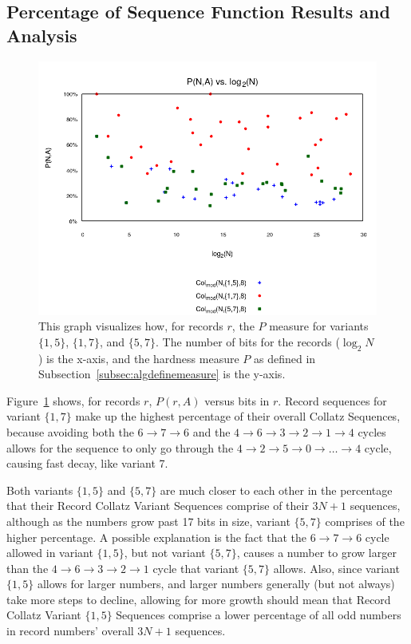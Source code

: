 \subsection{Percentage of Sequence Function Results and Analysis} \label{subsubsec:algmulpercentage}
\begin{figure}
    \centering
    \includegraphics[scale=0.6]{ModAvoidanceAnalysisPics/P_vs_log_multi_base.png}
    \caption{This graph visualizes how, for records $r$, the $P$ measure for variants $\{1,5\}$, $\{1,7\}$, and $\{5,7\}$. The number of bits for the records ($\log_2{N}$) is the x-axis, and the hardness measure $P$ as defined in Subsection~\ref{subsec:algdefinemeasure} is the y-axis.}
    \label{fig:p_multi_vslog}
\end{figure}
Figure~\ref{fig:p_multi_vslog} shows, for records $r$, $P(r,A)$ versus bits in $r$. Record sequences for variant $\{1,7\}$ make up the highest percentage of their overall Collatz Sequences, because avoiding both the $6 \rightarrow 7 \rightarrow 6$ and the $4 \rightarrow 6 \rightarrow 3 \rightarrow 2 \rightarrow 1 \rightarrow 4$ cycles allows for the sequence to only go through the $4  \rightarrow 2 \rightarrow 5 \rightarrow 0 \rightarrow \ldots \rightarrow 4$ cycle, causing fast decay, like variant 7. \par
Both variants $\{1,5\}$ and $\{5,7\}$ are much closer to each other in the percentage that their Record Collatz Variant Sequences comprise of their $3N+1$ sequences, although as the numbers grow past 17 bits in size, variant $\{5,7\}$ comprises of the higher percentage. A possible explanation is the fact that the $6 \rightarrow 7 \rightarrow 6$ cycle allowed in variant $\{1,5\}$, but not variant $\{5,7\}$, causes a number to grow larger than the $4 \rightarrow 6 \rightarrow 3 \rightarrow 2 \rightarrow 1$ cycle that variant $\{5,7\}$ allows. Also, since variant $\{1,5\}$ allows for larger numbers, and larger numbers generally (but not always) take more steps to decline, allowing for more growth should mean that Record Collatz Variant $\{1,5\}$ Sequences comprise a lower percentage of all odd numbers in record numbers' overall $3N+1$ sequences.

